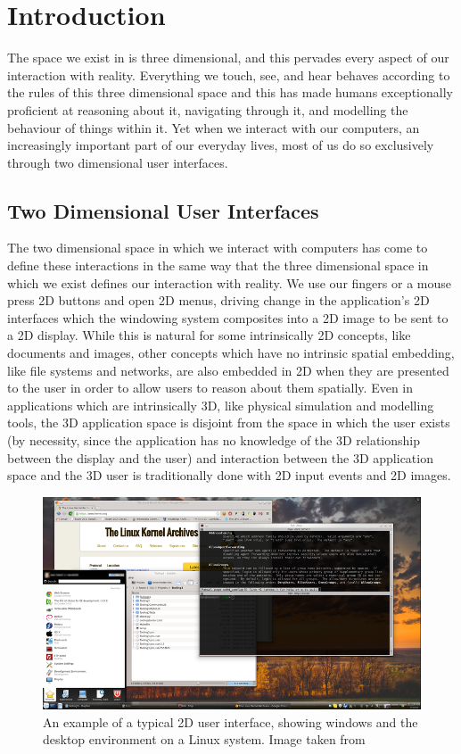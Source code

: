\chapter{Introduction}
The space we exist in is three dimensional, and this pervades every aspect of our interaction with reality. Everything we touch, see, and hear behaves according to the rules of this three dimensional space and this has made humans exceptionally proficient at reasoning about it, navigating through it, and modelling the behaviour of things within it. Yet when we interact with our computers, an increasingly important part of our everyday lives, most of us do so exclusively through two dimensional user interfaces. 
 
\section{Two Dimensional User Interfaces}

The two dimensional space in which we interact with computers has come to define these interactions in the same way that the three dimensional space in which we exist defines our interaction with reality. We use our fingers or a mouse press 2D buttons and open 2D menus, driving change in the application's 2D interfaces which the windowing system composites into a 2D image to be sent to a 2D display. While this is natural for some intrinsically 2D concepts, like documents and images, other concepts which have no intrinsic spatial embedding, like file systems and networks, are also embedded in 2D when they are presented to the user in order to allow users to reason about them spatially. Even in applications which are intrinsically 3D, like physical simulation and modelling tools, the 3D application space is disjoint from the space in which the user exists (by necessity, since the application has no knowledge of the 3D relationship between the display and the user) and interaction between the 3D application space and the 3D user is traditionally done with 2D input events and 2D images.  

\begin{figure}[ht!]
\centering
\includegraphics[width=1.0\textwidth]{images/kde.png}
\caption{An example of a typical 2D user interface, showing windows and the desktop environment on a Linux system. Image taken from  \protect\cite{kde-image}}
\label{fig:kde}
\end{figure}
	
